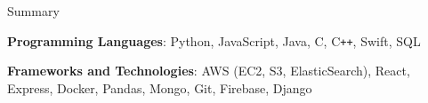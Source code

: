 \documentclass{resume} %
\begin{document}

\begin{rSection}{Summary}
  \begin{rSummarySection}
  {
    \item \textbf{Programming Languages}:  Python, JavaScript, Java, C, C\texttt{++}, Swift, SQL
    \item \textbf{Frameworks and Technologies}: AWS (EC2, S3, ElasticSearch), React, Express, Docker, Pandas, Mongo, Git, Firebase, Django
  }
  \end{rSummarySection}
\end{rSection}

\vspace{-0.5em}
\end{document}
